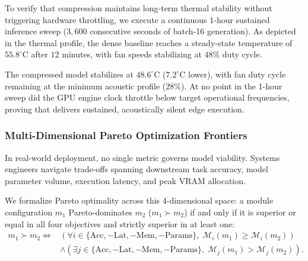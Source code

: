 To verify that compression maintains long-term thermal stability without triggering hardware throttling, we execute a continuous 1-hour sustained inference sweep ($3{,}600$ consecutive seconds of batch-16 generation). As depicted in the thermal profile, the dense baseline reaches a steady-state temperature of $55.8^\circ\text{C}$ after $12$ minutes, with fan speeds stabilizing at $48\%$ duty cycle. 

The \neuralops{} compressed model stabilizes at $48.6^\circ\text{C}$ ($7.2^\circ\text{C}$ lower), with fan duty cycle remaining at the minimum acoustic profile ($28\%$). At no point in the 1-hour sweep did the GPU engine clock throttle below target operational frequencies, proving that \neuralops{} delivers sustained, acoustically silent edge execution.

\subsubsection{Multi-Dimensional Pareto Optimization Frontiers}
\label{sec:results_pareto_frontiers}

In real-world deployment, no single metric governs model viability. Systems engineers navigate trade-offs spanning downstream task accuracy, model parameter volume, execution latency, and peak VRAM allocation.

We formalize Pareto optimality across this 4-dimensional space: a module configuration $m_1$ Pareto-dominates $m_2$ ($m_1 \succ m_2$) if and only if it is superior or equal in all four objectives and strictly superior in at least one:
\begin{equation}
\label{eq:pareto_definition}
\begin{aligned}
m_1 \succ m_2 \iff & \left( \forall i \in \{\text{Acc}, -\text{Lat}, -\text{Mem}, -\text{Params}\}, \; \mathcal{M}_i(m_1) \ge \mathcal{M}_i(m_2) \right) \\
& \land \left( \exists j \in \{\text{Acc}, -\text{Lat}, -\text{Mem}, -\text{Params}\}, \; \mathcal{M}_j(m_1) > \mathcal{M}_j(m_2) \right).
\end{aligned}
\end{equation}

